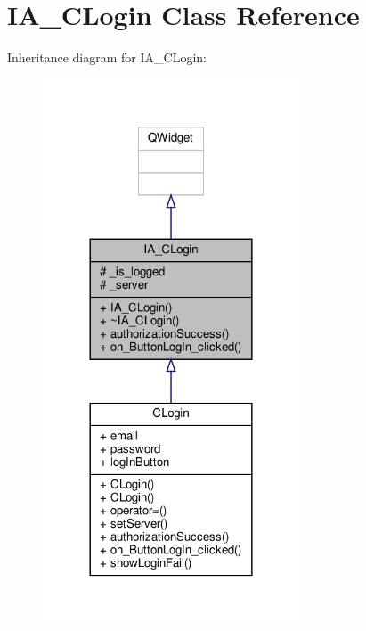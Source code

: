 \hypertarget{classIA__CLogin}{}\section{I\+A\+\_\+\+C\+Login Class Reference}
\label{classIA__CLogin}


Inheritance diagram for I\+A\+\_\+\+C\+Login\+:
\nopagebreak
\begin{figure}[H]
\begin{center}
\leavevmode
\includegraphics[width=216pt]{classIA__CLogin__inherit__graph}
\end{center}
\end{figure}


